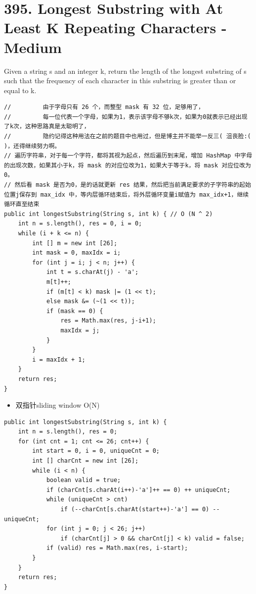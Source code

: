 \documentclass[9pt, b5paaper]{book}
\begin{document}
\section{395. Longest Substring with At Least K Repeating Characters - Medium}
\label{sec-6-8}
Given a string s and an integer k, return the length of the longest substring of s such that the frequency of each character in this substring is greater than or equal to k.
\begin{verbatim}
//         由于字母只有 26 个，而整型 mask 有 32 位，足够用了，
//         每一位代表一个字母，如果为1，表示该字母不够k次，如果为0就表示已经出现了k次，这种思路真是太聪明了，
//         隐约记得这种用法在之前的题目中也用过，但是博主并不能举一反三( 沮丧脸:( )，还得继续努力啊。
// 遍历字符串，对于每一个字符，都将其视为起点，然后遍历到末尾，增加 HashMap 中字母的出现次数，如果其小于k，将 mask 的对应位改为1，如果大于等于k，将 mask 对应位改为0。
// 然后看 mask 是否为0，是的话就更新 res 结果，然后把当前满足要求的子字符串的起始位置j保存到 max_idx 中，等内层循环结束后，将外层循环变量i赋值为 max_idx+1，继续循环直至结束
public int longestSubstring(String s, int k) { // O (N ^ 2)
    int n = s.length(), res = 0, i = 0;
    while (i + k <= n) {
        int [] m = new int [26];
        int mask = 0, maxIdx = i;
        for (int j = i; j < n; j++) {
            int t = s.charAt(j) - 'a';
            m[t]++;
            if (m[t] < k) mask |= (1 << t);
            else mask &= (~(1 << t));
            if (mask == 0) {
                res = Math.max(res, j-i+1);
                maxIdx = j;
            }
        }
        i = maxIdx + 1;
    }
    return res;
}
\end{verbatim}
\begin{itemize}
\item 双指针sliding window O(N)
\end{itemize}
\begin{verbatim}
public int longestSubstring(String s, int k) {
    int n = s.length(), res = 0;
    for (int cnt = 1; cnt <= 26; cnt++) {
        int start = 0, i = 0, uniqueCnt = 0;
        int [] charCnt = new int [26];
        while (i < n) {
            boolean valid = true;
            if (charCnt[s.charAt(i++)-'a']++ == 0) ++ uniqueCnt;
            while (uniqueCnt > cnt) 
                if (--charCnt[s.charAt(start++)-'a'] == 0) --uniqueCnt;
            for (int j = 0; j < 26; j++)
                if (charCnt[j] > 0 && charCnt[j] < k) valid = false;
            if (valid) res = Math.max(res, i-start);
        }
    }
    return res;
}
\end{verbatim}
\end{document}
